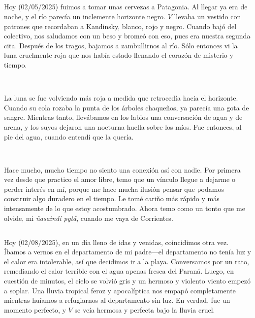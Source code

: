 \documentclass[a4paper, 12pt]{article}
\begin{document}
\subsection{}

Hoy (02/05/2025) fuimos a tomar unas cervezas a Patagonia. Al llegar ya era de
noche, y el río parecía un inclemente horizonte negro. $V$ llevaba un vestido con
patrones que recordaban a Kandinsky, blanco, rojo y negro. Cuando bajó del 
colectivo, nos saludamos con un beso y bromeó con eso, pues era nuestra
segunda cita. Después de los tragos, bajamos a zambullirnos al río. Sólo 
entonces vi la luna cruelmente roja que nos había estado llenando el corazón de
misterio y tiempo.

~

La luna se fue volviendo más roja a medida que retrocedía hacia el horizonte.
Cuando su cola rozaba la punta de los árboles chaqueños, ya parecía una gota de
sangre. Mientras tanto, llevábamos en los labios una conversación de agua y de
arena, y los suyos dejaron una nocturna huella sobre los míos. Fue entonces,
al pie del agua, cuando entendí que la quería.

~ 

Hace mucho, mucho tiempo no siento una conexión así con nadie. Por primera vez
desde que practico el amor libre, temo que un vínculo llegue a dejarme o perder
interés en mí, porque me hace mucha ilusión pensar que podamos construir algo
duradero en el tiempo. Le tomé cariño más rápido y más intensamente de lo que
estoy acostumbrado. Ahora temo como un tonto que me olvide, mi \textit{ñasaindí pytã},
cuando me vaya de Corrientes.

\subsection{}

Hoy (02/08/2025), en un día lleno de idas y venidas, coincidimos otra vez.
Íbamos a vernos en el departamento de mi padre---el departamento no tenía luz y
el calor era intolerable, así que decidimos ir a la playa. Conversamos por un
rato, remediando el calor terrible con el agua apenas fresca del Paraná. Luego,
en cuestión de minutos, el cielo se volvió gris y un hermoso y violento viento
empezó a soplar. Una lluvia tropical feroz y apocalíptica nos empapó
completamente mientras huíamos a refugiarnos al departamento sin luz. En
verdad, fue un momento perfecto, y $V$ se veía hermosa y perfecta bajo la
lluvia cruel. 

~ 
\end{document}
